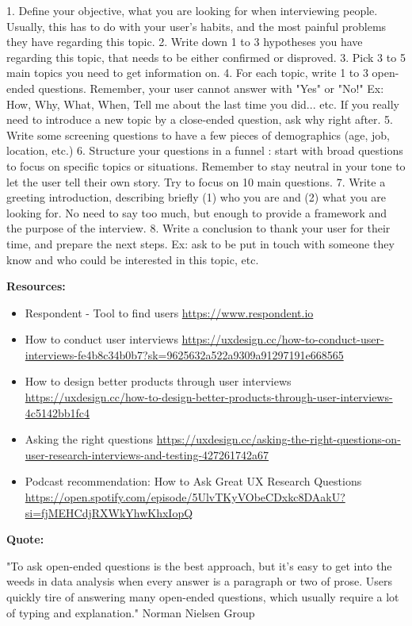 1. Define your objective, what you are looking for when interviewing people. Usually, this has to do with your user's habits, and the most painful problems they have regarding this topic.
2. Write down 1 to 3 hypotheses you have regarding this topic, that needs to be either confirmed or disproved.
3. Pick 3 to 5 main topics you need to get information on.
4. For each topic, write 1 to 3 open-ended questions. Remember, your user cannot answer with "Yes" or "No!" Ex: How, Why, What, When, Tell me about the last time you did... etc. If you really need to introduce a new topic by a close-ended question, ask why right after.
5. Write some screening questions to have a few pieces of demographics (age, job, location, etc.)
6. Structure your questions in a funnel : start with broad questions to focus on specific topics or situations. Remember to stay neutral in your tone to let the user tell their own story. Try to focus on 10 main questions.
7. Write a greeting introduction, describing briefly (1) who you are and (2) what you are looking for. No need to say too much, but enough to provide a framework and the purpose of the interview.
8. Write a conclusion to thank your user for their time, and prepare the next steps. Ex: ask to be put in touch with someone they know and who could be interested in this topic, etc.

\textbf{Resources:}

\begin{itemize}
\item Respondent - Tool to find users \url{https://www.respondent.io}
\item How to conduct user interviews \url{https://uxdesign.cc/how-to-conduct-user-interviews-fe4b8c34b0b7?sk=9625632a522a9309a91297191e668565}
\item How to design better products through user interviews \url{https://uxdesign.cc/how-to-design-better-products-through-user-interviews-4c5142bb1fc4}
\item Asking the right questions \url{https://uxdesign.cc/asking-the-right-questions-on-user-research-interviews-and-testing-427261742a67}
\item Podcast recommendation: How to Ask Great UX Research Questions \url{https://open.spotify.com/episode/5UlvTKyVObeCDxkc8DAakU?si=fjMEHCdjRXWkYhwKhxIopQ}
\end{itemize}

\textbf{Quote:}

"To ask open-ended questions is the best approach, but it's easy to get into the weeds in data analysis when every answer is a paragraph or two of prose. Users quickly tire of answering many open-ended questions, which usually require a lot of typing and explanation." Norman Nielsen Group

